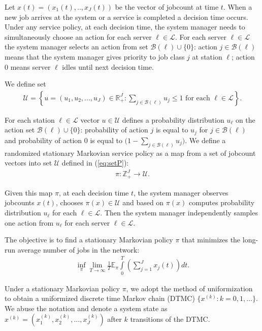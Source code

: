 \documentclass[11pt]{article}
\newcommand{\R}{\mathbb{R}}
\newcommand{\Z}{\mathbb{Z}}
\newcommand{\E}{\mathbb{E}}
\newcommand{\B}{\mathcal{B}}
\newcommand{\LL}{\mathcal{L}}
\theoremstyle{definition}
\numberwithin{equation}{section}
\begin{document}
Let $x(t) = \left( x_1(t), .., x_J(t) \right)$ be the vector of jobcount at time $t$.  When a new job arrives at the system or a service is completed a decision time occurs.   Under any service policy, at each decision time, the system manager needs to simultaneously choose an action for each server $\ell\in \LL$.
For each server $\ell\in \LL$ the system manager selects an action from set $\B(\ell)\cup \{0\}$: action $j\in \B(\ell)$ means that  the system manager gives priority to  job class $j$ at station $\ell$; action $0$ means server $\ell$ idles until next decision time.

We define  set
\begin{align}\label{eq:setP}
  \mathcal{U}=\left\{u= \left(u_1, u_2,..., u_J\right)\in \R^J_+:     \sum\limits_{j\in \B(\ell)} u_j\le1 \text{ for each }\ell\in \LL\right\}.
\end{align}




For each station $\ell\in \LL$ vector $u\in \mathcal{U}$ defines a probability distribution $u_\ell$ on the action set  $\B(\ell)\cup \{0\}$: probability of action $j$ is equal to $u_j$ for $j\in \B(\ell)$ and  probability of action $0$ is equal to $\Big(1 - \sum\limits_{j\in \B(\ell)} u_j\Big)$.
We define a randomized stationary Markovian service policy as a map from a set of jobcount vectors into set $\mathcal{U}$ defined in (\ref{eq:setP}):
\begin{align*}
\pi:\Z_+^J\rightarrow \mathcal{U}.\end{align*}

Given this map $\pi$, at each decision time $t$, the system manager
observes jobcounts $x(t)$, chooses $\pi(x)\in\mathcal{U}$ and based on $\pi(x)$ computes probability distribution $u_\ell$ for each $\ell\in \LL$.
Then  the system manager  independently samples  one action from $u_\ell$  for each server $\ell\in \LL$.



 The objective is to find a stationary Markovian policy  $\pi$ that   minimizes the  long-run average number of jobs in the network:
\begin{align}\label{eq:obj3}
\inf\limits_{\pi} \lim\limits_{T\rightarrow \infty} \frac{1}{T} \E_\pi \int\limits_0^T\left(\sum\limits_{j=1}^J x_j(t)\right)dt.
\end{align}





Under a stationary Markovian policy $\pi$, we adopt the method of uniformization to obtain a uniformized discrete time Markov chain (DTMC) $\{x^{(k)}:k=0, 1, \ldots \}$. We abuse the notation and denote a system state as $x^{(k)} = \left( x_1^{( k)}, x_2^{(k)}, ..., x_J^{(k)} \right)$ after $k$ transitions of the DTMC.
\end{document}

